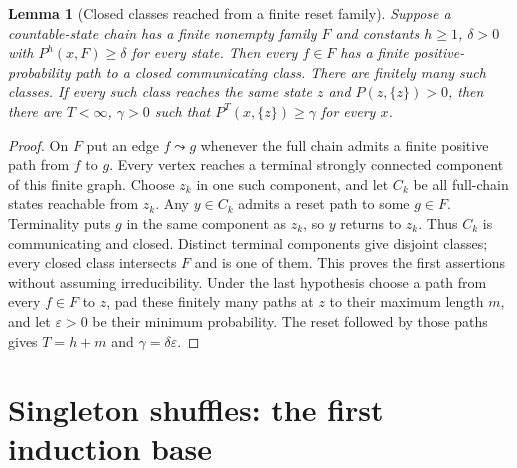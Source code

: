 \documentclass[11pt]{article}
\newtheorem{lemma}[theorem]{Lemma}
\begin{document}
\begin{lemma}[Closed classes reached from a finite reset family]
\label{cor:thesisgeneralregimes}
Suppose a countable-state chain has a finite nonempty family $F$ and
constants $h\ge1$, $\delta>0$ with $P^h(x,F)\ge\delta$ for every
state. Then every $f\in F$ has a finite positive-probability path to
a closed communicating class. There are finitely many such classes.
If every such class reaches the same state $z$ and $P(z,\{z\})>0$,
then there are $T<\infty$, $\gamma>0$ such that
$P^T(x,\{z\})\ge\gamma$ for every $x$.
\end{lemma}
\begin{proof}
On $F$ put an edge $f\leadsto g$ whenever the full chain admits a
finite positive path from $f$ to $g$. Every vertex reaches a terminal
strongly connected component of this finite graph. Choose $z_k$ in
one such component, and let $C_k$ be all full-chain states reachable
from $z_k$. Any $y\in C_k$ admits a reset path to some $g\in F$.
Terminality puts $g$ in the same component as $z_k$, so $y$ returns
to $z_k$. Thus $C_k$ is communicating and closed. Distinct terminal
components give disjoint classes; every closed class intersects $F$
and is one of them. This proves the first assertions without assuming
irreducibility. Under the last hypothesis choose a path from every
$f\in F$ to $z$, pad these finitely many paths at $z$ to their maximum
length $m$, and let $\varepsilon>0$ be their minimum probability.
The reset followed by those paths gives $T=h+m$ and
$\gamma=\delta\varepsilon$.
\end{proof}

\section{Singleton shuffles: the first induction base}
\end{document}

